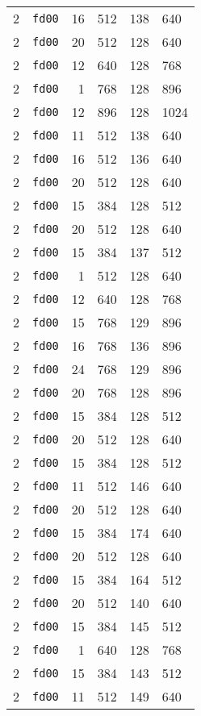 \documentclass{article}
\begin{document}
\begin{table}[h!]
\begin{tabular}{llrrrl}
    2 & \texttt{fd00} & 16 & 512 & 138 & 640 \\
    2 & \texttt{fd00} & 20 & 512 & 128 & 640 \\
    2 & \texttt{fd00} & 12 & 640 & 128 & 768 \\
    2 & \texttt{fd00} & 1 & 768 & 128 & 896 \\
    2 & \texttt{fd00} & 12 & 896 & 128 & 1024 \\
    2 & \texttt{fd00} & 11 & 512 & 138 & 640 \\
    2 & \texttt{fd00} & 16 & 512 & 136 & 640 \\
    2 & \texttt{fd00} & 20 & 512 & 128 & 640 \\
    2 & \texttt{fd00} & 15 & 384 & 128 & 512 \\
    2 & \texttt{fd00} & 20 & 512 & 128 & 640 \\
    2 & \texttt{fd00} & 15 & 384 & 137 & 512 \\
    2 & \texttt{fd00} & 1 & 512 & 128 & 640 \\
    2 & \texttt{fd00} & 12 & 640 & 128 & 768 \\
    2 & \texttt{fd00} & 15 & 768 & 129 & 896 \\
    2 & \texttt{fd00} & 16 & 768 & 136 & 896 \\
    2 & \texttt{fd00} & 24 & 768 & 129 & 896 \\
    2 & \texttt{fd00} & 20 & 768 & 128 & 896 \\
    2 & \texttt{fd00} & 15 & 384 & 128 & 512 \\
    2 & \texttt{fd00} & 20 & 512 & 128 & 640 \\
    2 & \texttt{fd00} & 15 & 384 & 128 & 512 \\
    2 & \texttt{fd00} & 11 & 512 & 146 & 640 \\
    2 & \texttt{fd00} & 20 & 512 & 128 & 640 \\
    2 & \texttt{fd00} & 15 & 384 & 174 & 640 \\
    2 & \texttt{fd00} & 20 & 512 & 128 & 640 \\
    2 & \texttt{fd00} & 15 & 384 & 164 & 512 \\
    2 & \texttt{fd00} & 20 & 512 & 140 & 640 \\
    2 & \texttt{fd00} & 15 & 384 & 145 & 512 \\
    2 & \texttt{fd00} & 1 & 640 & 128 & 768 \\
    2 & \texttt{fd00} & 15 & 384 & 143 & 512 \\
    2 & \texttt{fd00} & 11 & 512 & 149 & 640 \\

\end{tabular}
\end{table}
\end{document}
